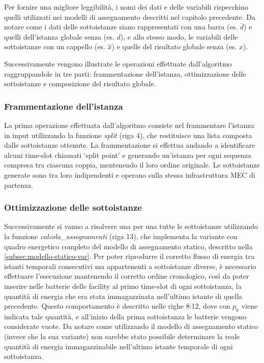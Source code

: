 Per fornire una migliore leggibilità, i nomi dei dati e delle variabili rispecchino quelli utilizzati nei modelli di assegnamento descritti nel capitolo precedente. Da notare come i dati delle sottoistanze siano rappresentati con una barra (es. $\bar{d}$) e quelli dell'istanza globale senza (es. $d$), e allo stesso modo, le variabili delle sottoistanze con un cappello (es. $\hat{x}$) e quelle del risultato globale senza (es. $x$).

Successivamente vengono illustrate le operazioni effettuate dall'algoritmo raggruppandole in tre parti: frammentazione dell'istanza, ottimizzazione delle sottoistanze e composizione del risultato globale.

\subsubsection{Frammentazione dell'istanza}

La prima operazione effettuata dall'algoritmo consiste nel frammentare l'istanza in input utilizzando la funzione \textit{split} (riga 4), che restituisce una lista composta dalle sottoistanze ottenute. La frammentazione si effettua andando a identificare alcuni time-slot chiamati `split point' e generando un'istanza per ogni sequenza compresa tra ciascuna coppia, mentenendo il loro ordine originale. Le sottoistanze generate sono tra loro indipendenti e operano sulla stessa infrastruttura MEC di partenza.

\subsubsection{Ottimizzazione delle sottoistanze}

Successivamente si vanno a risolvere una per una tutte le sottoistanze utilizzando la funzione \textit{calcola\_assegnamenti} (riga 13), che implementa la variante con quadro energetico completo del modello di assegnamento statico, descritto nella \autoref{subsec:modello-statico-var}. Per poter riprodurre il corretto flusso di energia tra istanti temporali consecutivi ma appartenenti a sottoistanze diverse, è necessario effettuare l'esecuzione mantenendo il corretto ordine cronologico, così da poter inserire nelle batterie delle facility al primo time-slot di ogni sottoistanza, la quantità di energia che era stata immagazzinata nell'ultimo istante di quella precedente. Questo comportamento è descritto nelle righe 8:12, dove con $p_k$ viene indicata tale quantità, e all'inizio della prima sottoistanza le batterie vengono considerate vuote. Da notare come utilizzando il modello di assegnamento statico (invece che la sua variante) non sarebbe stato possibile determinare la reale quantità di energia immagazzinabile nell'ultimo istante temporale di ogni sottoistanza.

